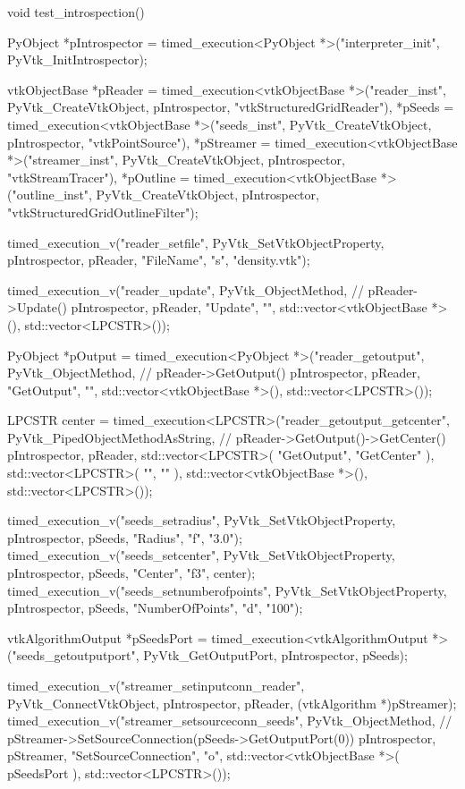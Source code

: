 \begin{appendices}
\begin{cpp}[label=lst:cpp-intro-vtk,caption={Introspective C++ VTK benchmark source code.},aboveskip=20pt]
void test_introspection()
{

	PyObject *pIntrospector = timed_execution<PyObject *>("interpreter_init", PyVtk_InitIntrospector);

	vtkObjectBase
		*pReader = timed_execution<vtkObjectBase *>("reader_inst", PyVtk_CreateVtkObject, pIntrospector, "vtkStructuredGridReader"),
		*pSeeds = timed_execution<vtkObjectBase *>("seeds_inst", PyVtk_CreateVtkObject, pIntrospector, "vtkPointSource"),
		*pStreamer = timed_execution<vtkObjectBase *>("streamer_inst", PyVtk_CreateVtkObject, pIntrospector, "vtkStreamTracer"),
		*pOutline = timed_execution<vtkObjectBase *>("outline_inst", PyVtk_CreateVtkObject, pIntrospector, "vtkStructuredGridOutlineFilter");

	timed_execution_v("reader_setfile", PyVtk_SetVtkObjectProperty, pIntrospector, pReader, "FileName", "s", "density.vtk");

	timed_execution_v("reader_update", PyVtk_ObjectMethod, // pReader->Update()
		pIntrospector,
		pReader,
		"Update",
		"",
		std::vector<vtkObjectBase *>(),
		std::vector<LPCSTR>());


	PyObject *pOutput = timed_execution<PyObject *>("reader_getoutput", PyVtk_ObjectMethod, // pReader->GetOutput()
		pIntrospector,
		pReader,
		"GetOutput",
		"",
		std::vector<vtkObjectBase *>(),
		std::vector<LPCSTR>());

	LPCSTR center = timed_execution<LPCSTR>("reader_getoutput_getcenter", PyVtk_PipedObjectMethodAsString, // pReader->GetOutput()->GetCenter()
		pIntrospector,
		pReader,
		std::vector<LPCSTR>({ "GetOutput", "GetCenter" }),
		std::vector<LPCSTR>({ "", "" }),
		std::vector<vtkObjectBase *>(),
		std::vector<LPCSTR>());

	timed_execution_v("seeds_setradius", PyVtk_SetVtkObjectProperty, pIntrospector, pSeeds, "Radius", "f", "3.0");
	timed_execution_v("seeds_setcenter", PyVtk_SetVtkObjectProperty, pIntrospector, pSeeds, "Center", "f3", center);
	timed_execution_v("seeds_setnumberofpoints", PyVtk_SetVtkObjectProperty, pIntrospector, pSeeds, "NumberOfPoints", "d", "100");

	vtkAlgorithmOutput *pSeedsPort = timed_execution<vtkAlgorithmOutput *>("seeds_getoutputport", PyVtk_GetOutputPort, pIntrospector, pSeeds);

	timed_execution_v("streamer_setinputconn_reader", PyVtk_ConnectVtkObject, pIntrospector, pReader, (vtkAlgorithm *)pStreamer);
	timed_execution_v("streamer_setsourceconn_seeds", PyVtk_ObjectMethod, // pStreamer->SetSourceConnection(pSeeds->GetOutputPort(0))
		pIntrospector,
		pStreamer,
		"SetSourceConnection",
		"o",
		std::vector<vtkObjectBase *>({ pSeedsPort }),
		std::vector<LPCSTR>());

}
\end{cpp}
\end{appendices}
